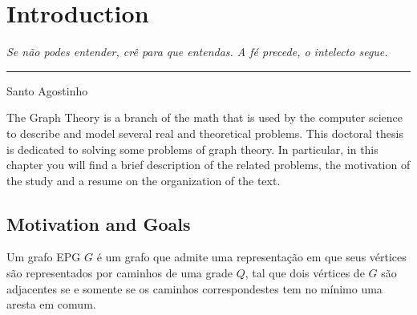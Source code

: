 \chapter{Introduction}

\begin{flushright}
\begin{minipage}[t][0cm][b]{0.47\textwidth}
\emph{Se não podes entender, crê para que entendas. A fé precede, o intelecto segue.}
\end{minipage}

\rule[0cm]{7cm}{0.03cm}%

Santo Agostinho
\end{flushright}

The Graph Theory is a branch of the math that is used by the computer science to describe and model several real and theoretical problems.  This doctoral thesis is dedicated to solving some problems of graph theory. In particular, in this chapter you will find a brief description of the related problems, the motivation of the study and a resume on the organization of the text.

\section{Motivation and Goals}

Um grafo EPG $G$ é um grafo que admite uma representação em que seus vértices são representados por caminhos de uma grade $Q$, tal que dois vértices de $G$ são adjacentes se e somente se os caminhos correspondestes tem no mínimo uma aresta em comum.



